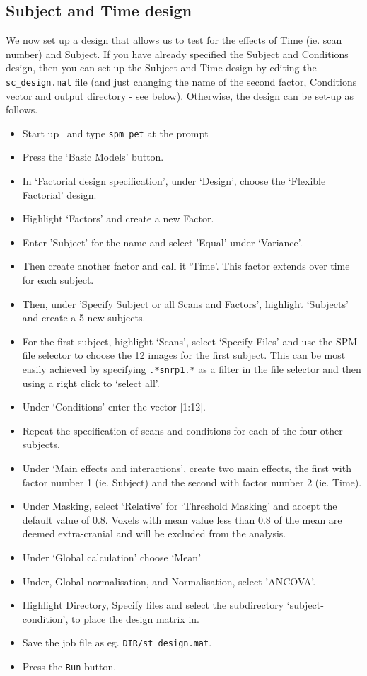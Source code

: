 \subsection{Subject and Time design}

We now set up a design that allows us to test for the effects of Time (ie. scan number) and Subject. If you have already specified the Subject and Conditions design, then you can set up the Subject and Time design by editing the \texttt{sc\_design.mat} file (and just changing the name of the second factor, Conditions vector and output directory - see below). Otherwise, the design can be set-up as follows.
\begin{itemize}
\item{Start up \matlab\ and type \texttt{spm pet} at the prompt}
\item{Press the `Basic Models' button.}
\item{In `Factorial design specification', under `Design', choose the `Flexible Factorial' design.}
\item{Highlight `Factors' and create a new Factor.}
\item{Enter 'Subject' for the name and select 'Equal' under `Variance'.}
\item{Then create another factor and call it `Time'. This factor extends over time for each subject.}
\item{Then, under 'Specify Subject or all Scans and Factors', highlight `Subjects' and create a 5 new subjects.}
\item{For the first subject, highlight `Scans', select `Specify Files' and use the SPM file selector to choose the 12 images for the first subject. This can be most easily achieved by specifying \texttt{.*snrp1.*} as a filter in the file selector and then using a right click to `select all'.}
\item{Under `Conditions' enter the vector [1:12].}
\item{Repeat the specification of scans and conditions for each of the four other subjects.}
\item{Under `Main effects and interactions', create two main effects, the first with factor number 1 (ie. Subject) and the second with factor number 2 (ie. Time).}
\item{Under Masking, select `Relative' for `Threshold Masking' and accept the default value of 0.8. Voxels with mean value less than 0.8 of the mean are deemed extra-cranial and will be excluded from the analysis.}
\item{Under `Global calculation' choose `Mean'}
\item{Under, Global normalisation, and Normalisation, select 'ANCOVA'.}
\item{Highlight Directory, Specify files and select the subdirectory `subject-condition', to place the design matrix in.}
\item{Save the job file as eg. \texttt{DIR/st\_design.mat}.}
\item{Press the \texttt{Run} button.}
\end{itemize}
